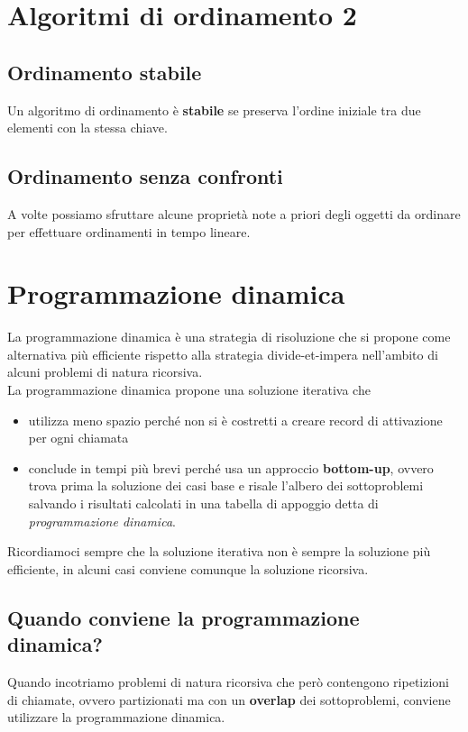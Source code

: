 \documentclass{article}
\begin{document}
\section{Algoritmi di ordinamento 2}
\subsection*{Ordinamento stabile}
Un algoritmo di ordinamento è \textbf{stabile} se preserva l'ordine iniziale tra due elementi con la stessa chiave.

\subsection{Ordinamento senza confronti}
A volte possiamo sfruttare alcune proprietà note a priori degli oggetti da ordinare per effettuare ordinamenti in tempo lineare.
\pagebreak

\section{Programmazione dinamica}
La programmazione dinamica è una strategia di risoluzione che si propone come alternativa più efficiente rispetto alla strategia divide-et-impera nell'ambito di alcuni problemi di natura ricorsiva. \\
La programmazione dinamica propone una soluzione iterativa che
\begin{itemize}
  \item utilizza meno spazio perché non si è costretti a creare record di attivazione per ogni chiamata
  \item conclude in tempi più brevi perché usa un approccio \textbf{bottom-up}, ovvero trova prima la soluzione dei casi base e risale l'albero dei sottoproblemi salvando i risultati calcolati in una tabella di appoggio detta di \emph{programmazione dinamica}.
\end{itemize}
Ricordiamoci sempre che la soluzione iterativa non è sempre la soluzione più efficiente, in alcuni casi conviene comunque la soluzione ricorsiva.
\subsection*{Quando conviene la programmazione dinamica?}
Quando incotriamo problemi di natura ricorsiva che però contengono ripetizioni di chiamate, ovvero partizionati ma con un \textbf{overlap} dei sottoproblemi, conviene utilizzare la programmazione dinamica.
\end{document}
